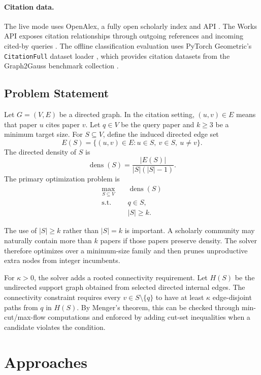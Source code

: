 \documentclass[11pt]{article}
\newcommand{\dens}{\operatorname{dens}}
\begin{document}
\paragraph{Citation data.}
The live mode uses OpenAlex, a fully open scholarly index and API
\cite{priem2022}. The Works API exposes citation relationships through outgoing
references and incoming cited-by queries \cite{openalexworks}. The offline
classification evaluation uses PyTorch Geometric's \texttt{CitationFull}
dataset loader \cite{fey2019,pygcitationfull}, which provides citation datasets
from the Graph2Gauss benchmark collection \cite{bojchevski2017}.

\subsection{Problem Statement}

Let $G=(V,E)$ be a directed graph. In the citation setting, $(u,v)\in E$ means
that paper $u$ cites paper $v$. Let $q\in V$ be the query paper and $k\geq 3$
be a minimum target size. For $S\subseteq V$, define the induced directed edge
set
\[
  E(S) = \{(u,v)\in E : u\in S,\ v\in S,\ u\neq v\}.
\]
The directed density of $S$ is
\[
  \dens(S) = \frac{|E(S)|}{|S|(|S|-1)}.
\]
The primary optimization problem is
\begin{align}
  \max_{S\subseteq V} \quad & \dens(S) \label{eq:main-problem}\\
  \text{s.t.} \quad & q \in S, \nonumber\\
                    & |S| \geq k. \nonumber
\end{align}

The use of $|S|\geq k$ rather than $|S|=k$ is important. A scholarly community
may naturally contain more than $k$ papers if those papers preserve density. The
solver therefore optimizes over a minimum-size family and then prunes
unproductive extra nodes from integer incumbents.

For $\kappa>0$, the solver adds a rooted connectivity requirement. Let
$H(S)$ be the undirected support graph obtained from selected directed internal
edges. The connectivity constraint requires every $v\in S\setminus\{q\}$ to
have at least $\kappa$ edge-disjoint paths from $q$ in $H(S)$. By Menger's
theorem, this can be checked through min-cut/max-flow computations and enforced
by adding cut-set inequalities when a candidate violates the condition.

\section{Approaches}
\end{document}
